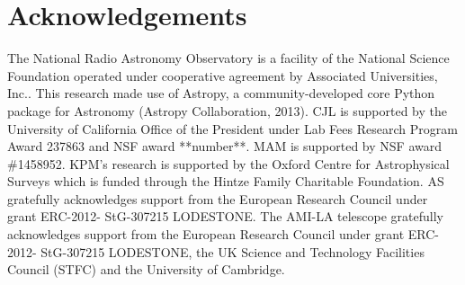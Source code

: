 \documentclass[twocolumn]{aastex61}
\begin{document}


\section*{Acknowledgements}
The National Radio Astronomy Observatory is a facility of the National Science Foundation operated under cooperative agreement by Associated Universities, Inc..
This research made use of Astropy, a community-developed core Python package for Astronomy (Astropy Collaboration, 2013).
CJL is supported by the University of California Office of the President under Lab Fees Research Program Award 237863 and NSF award **number**.
MAM is supported by NSF award \#1458952. 
KPM's research is supported by the Oxford Centre for Astrophysical Surveys which is funded through the Hintze Family Charitable Foundation. AS gratefully acknowledges support from the European Research Council under grant ERC-2012- StG-307215 LODESTONE. The AMI-LA telescope gratefully acknowledges support from the European Research Council under grant ERC-2012- StG-307215 LODESTONE, the UK Science and Technology Facilities Council (STFC) and the University of Cambridge.





\end{document}
